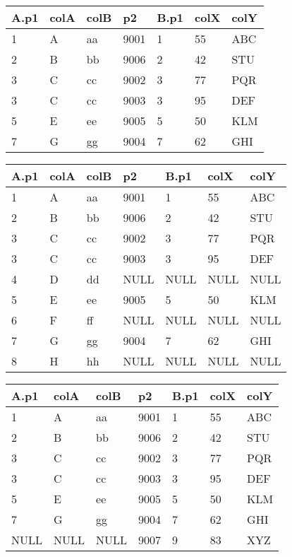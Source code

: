 \documentclass[10pt, a4paper, ngerman]{arbeitsblatt}
\begin{document}
\begin{aufgabe}
\begin{tabular}{*{7}{l}} \hline
	\rowcolor{ab.tabelle.kopf.hg}
	A.p1 & colA & colB & p2 & B.p1 & colX & colY      \\
	\hline\midrule
	1 & A & aa & 9001 & 1 & 55 & ABC \\\midrule
	2 & B & bb & 9006 & 2 & 42 & STU \\\midrule
	3 & C & cc & 9002 & 3 & 77 & PQR \\\midrule
	3 & C & cc & 9003 & 3 & 95 & DEF \\\midrule
	5 & E & ee & 9005 & 5 & 50 & KLM \\\midrule
	7 & G & gg & 9004 & 7 & 62 & GHI \\\bottomrule
\end{tabular}

\begin{tabular}{*{7}{l}}\hline
	\rowcolor{ab.tabelle.kopf.hg}
	A.p1 & colA & colB & p2 & B.p1 & colX & colY      \\
	\hline\midrule
	1 & A & aa & 9001 & 1 & 55 & ABC \\\hline
	2 & B & bb & 9006 & 2 & 42 & STU \\\hline
	3 & C & cc & 9002 & 3 & 77 & PQR \\\hline
	3 & C & cc & 9003 & 3 & 95 & DEF \\\hline
	4 & D & dd & NULL & NULL & NULL & NULL\\\hline
	5 & E & ee & 9005 & 5 & 50 & KLM \\\hline
	6 & F & ff & NULL & NULL & NULL & NULL \\\hline
	7 & G & gg & 9004 & 7 & 62 & GHI \\\hline
	8 & H & hh & NULL & NULL & NULL & NULL \\\hline
\end{tabular}

\begin{tabular}{*{7}{l}}\hline
	\rowcolor{ab.tabelle.kopf.hg}
	A.p1 & colA & colB & p2 & B.p1 & colX & colY      \\
	\hline\midrule
	1 & A & aa & 9001 & 1 & 55 & ABC \\\hline
	2 & B & bb & 9006 & 2 & 42 & STU \\\hline
	3 & C & cc & 9002 & 3 & 77 & PQR \\\hline
	3 & C & cc & 9003 & 3 & 95 & DEF \\\hline
	5 & E & ee & 9005 & 5 & 50 & KLM \\\hline
	7 & G & gg & 9004 & 7 & 62 & GHI \\\hline
	NULL & NULL & NULL & 9007 & 9 & 83 & XYZ \\\hline
\end{tabular}


\end{aufgabe}
\end{document}
